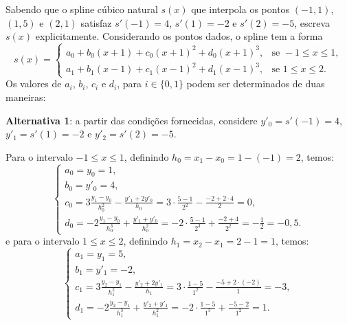 \documentclass[12pt,a4paper]{article}
\begin{document}
\begin{ExerciseList}
\Exercise[title={2,5}] Sabendo que o spline cúbico natural \( s(x) \) que interpola os pontos \( (-1, 1) \), \( (1, 5) \) e \( (2, 1) \) satisfaz \( s'(-1) = 4 \), \( s'(1) = -2 \) e \( s'(2) = -5 \), escreva \( s(x) \) explicitamente.
\Answer Considerando os pontos dados, o spline tem a forma
\[
  s(x) =
  \begin{cases}
    a_0 + b_0(x + 1) + c_0(x + 1)^2 + d_0(x + 1)^3, & \text{se } -1 \leq x \leq 1,\\
    a_1 + b_1(x - 1) + c_1(x - 1)^2 + d_1(x - 1)^3, & \text{se } 1 \leq x \leq 2.
  \end{cases}
\]
Os valores de \( a_i \), \( b_i \), \( c_i \) e \( d_i \), para $i \in \{0, 1\}$ podem ser determinados de duas maneiras:

\textbf{Alternativa 1}: a partir das condições fornecidas, considere $y'_0 = s'(-1) = 4$, $y'_1 = s'(1) = -2$ e $y'_2 = s'(2) = -5$.

Para o intervalo \( -1 \leq x \leq 1 \), definindo $h_0 = x_1 - x_0 = 1 - (-1) = 2$, temos:
\[
\begin{cases}
  a_0 = y_0 = 1,\\
  b_0 = y'_0 = 4,\\
  c_0 = 3 \frac{y_1 - y_0}{h_0^2} - \frac{y'_1 + 2 y'_0}{h_0}
      = 3 \cdot \frac{5 - 1}{2^2} - \frac{-2 + 2 \cdot 4}{2}
      = 0,\\
  d_0 = -2 \frac{y_1 - y_0}{h_0^3} + \frac{y'_1 + y'_0}{h_0^2}
      = -2 \cdot \frac{5 - 1}{2^3} + \frac{-2 + 4}{2^2}
      = -\frac{1}{2}
      = -0,5.
\end{cases}
\]
e para o intervalo \( 1 \leq x \leq 2 \), definindo $h_1 = x_2 - x_1 = 2 - 1 = 1$, temos:
\[
\begin{cases}
  a_1 = y_1 = 5,\\
  b_1 = y'_1 = -2,\\
  c_1 = 3 \frac{y_2 - y_1}{h_1^2} - \frac{y'_2 + 2 y'_1}{h_1}
      = 3 \cdot \frac{1 - 5}{1^2} - \frac{-5 + 2 \cdot (-2)}{1}
      = -3,\\
  d_1 = -2 \frac{y_2 - y_1}{h_1^3} + \frac{y'_2 + y'_1}{h_1^2}
      = -2 \cdot \frac{1 - 5}{1^3} + \frac{-5 - 2}{1^2}
      = 1.
\end{cases}
\]


\end{ExerciseList}
\end{document}

